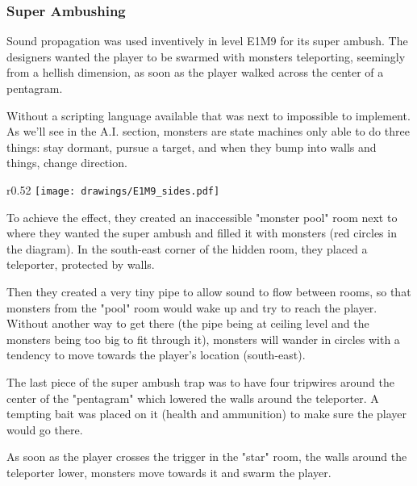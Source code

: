 \subsubsection{Super Ambushing}
Sound propagation was used inventively in level E1M9 for its super ambush.  The designers wanted the player to be swarmed with monsters teleporting, seemingly from a hellish dimension, as soon as the player walked across the center of a pentagram.\\
\par
 Without a scripting language available that was next to impossible to implement. As we'll see in the A.I. section, monsters are state machines only able to do three things: stay dormant, pursue a target, and when they bump into walls and things, change direction.\\
\par
\begin{wrapfigure}[24]{r}{0.52\textwidth}
\centering
\texttt{[image: drawings/E1M9\_sides.pdf]}
\end{wrapfigure}

\par

To achieve the effect, they created an inaccessible "monster pool" room next to where they wanted the super ambush and filled it with monsters (red circles in the diagram). In the south-east corner of the hidden room, they placed a teleporter, protected by walls.\\
\par
Then they created a very tiny pipe to allow sound to flow between rooms, so that monsters from the "pool" room would wake up and try to reach the player. Without another way to get there (the pipe being at ceiling level and the monsters being too big to fit through it), monsters will wander in circles with a tendency to move towards the player's location (south-east).\\
\par
The last piece of the super ambush trap was to have four tripwires around the center of the "pentagram" which lowered the walls around the teleporter. A tempting bait was placed on it (health and ammunition) to make sure the player would go there.\\
\par

As soon as the player crosses the trigger in the "star" room, the walls around the teleporter lower, monsters move towards it and swarm the player. \\
\par
{}







